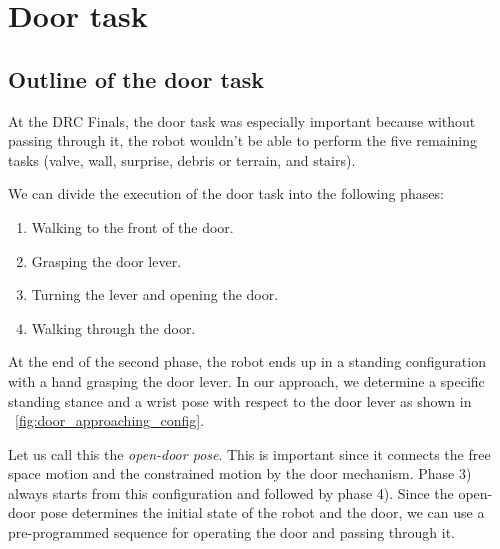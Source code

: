 \section{Door task}
	\label{sub:door}

\subsection{Outline of the door task}
%
At the DRC Finals, the door task was especially important because without passing through it,
the robot wouldn't be able to perform the five remaining tasks
(valve, wall, surprise, debris or terrain, and stairs).
   
We can divide the execution of the door task into the following phases:
%
\begin{enumerate}
	\item Walking to the front of the door.
	\item Grasping the door lever.
	\item Turning the lever and opening the door.
	\item Walking through the door.
\end{enumerate}
%

%

At the end of the second phase, the robot ends up in a standing configuration with a hand grasping
the door lever.
In our approach, we determine a specific standing stance and a wrist pose with respect to 
the door lever as shown in \figurename~\ref{fig:door_approaching_config}.

Let us call this the {\it open-door pose}.
This is important since it connects the free space motion and the constrained motion by
the door mechanism. 
Phase 3) always starts from this configuration and followed by phase 4). Since the open-door pose
determines the initial state of the robot and the door, 
we can use a pre-programmed sequence for operating the door and passing through it.

